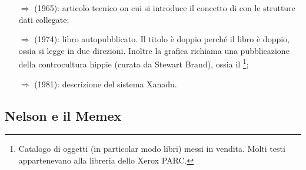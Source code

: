 \begin{itemize}
    \item [$\Rightarrow$]  (1965): 
    articolo tecnico on cui si introduce il concetto di  con le strutture dati collegate;
    \item [$\Rightarrow$]  (1974): libro autopubblicato.
    Il titolo è doppio perché il libro è doppio, ossia si legge in due direzioni.
    Inoltre la grafica richiama una pubblicazione della controcultura hippie (curata da Stewart Brand),
    ossia il \footnote{Catalogo di oggetti (in particolar modo libri)
    messi in vendita. Molti testi appartenevano alla libreria dello Xerox PARC.};
    \item [$\Rightarrow$]  (1981): descrizione del sistema Xanadu.
\end{itemize}



\subsection{Nelson e il Memex}



